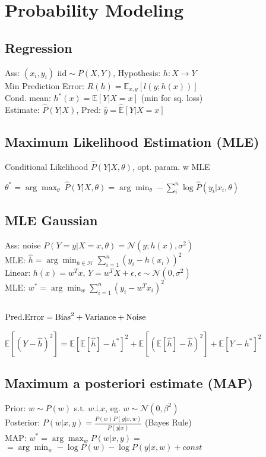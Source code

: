 \section*{\normalsize{Probability Modeling}}
\subsection*{Regression}
Ass: $(x_i,y_i) \text{ iid} \sim P(X,Y)$, Hypothesis:  $h:X\rightarrow Y$ \\
Min Prediction Error: $R(h) = \mathbb{E}_{x,y}[l(y;h(x))]$  \\
Cond. mean: $h^*(x) = \mathbb{E}[Y|X=x]$ (min for sq. loss)\\
Estimate: $\hat{P}(Y|X) $, Pred: $\hat{y} = \hat{\mathbb{E}}[Y|X=x]$

\subsection*{Maximum Likelihood Estimation (MLE)}
Conditional Likelihood $\hat{P}(Y|X,\theta)$, opt. param. w MLE

$\theta^* = \arg\max_\theta\:\hat{P}(Y|X,\theta) = 
\arg\min_\theta -\sum_{i}^n \log \hat{P}(y_i|x_i,\theta)$

\subsection*{MLE Gaussian}
Ass: noise $P(Y=y|X=x,\theta)=\mathcal{N}(y;h(x),\sigma^2)$\\
MLE: $ \hat{h} = \arg\min_{h \in \mathcal{H} } \sum_{i=1}^n(y_i - h(x_i))^2$\\
Linear: $h(x)=w^Tx$, $ Y=w^T X + \epsilon, \epsilon \sim \mathcal{N}(0, \sigma^2)$\\
MLE: $w^*=\arg\min_w \sum_{i=1}^n(y_i-w^Tx_i)^2$
\subsection*{$\color{black}{\text{Pred.Error}=\text{Bias}^2+\text{Variance}+\text{Noise}}$}
$ \mathds{E}[(Y-\hat{h})^2]=
\mathds{E}[\mathds{E}[\hat{h}]-h^*]^2+
\mathds{E}[(\mathds{E}[\hat{h}]-\hat{h})^2]+
\mathds{E}[Y-h^*]^2
$ 

\subsection*{Maximum a posteriori estimate (MAP)}
Prior: $w \sim P(w)$ s.t. $w \bot x$, eg. $w \sim \mathcal{N}(0,\beta^2)$\\
Posterior: $P(w|x,y)=\frac{P(w)P(y|x,w)}{P(y|x)} $ (Bayes Rule)\\
MAP: $w^*=\arg\max_w P(w|x,y) =$\\
$=\arg\min_w -\log P(w)-\log P(y|x,w)+const$

